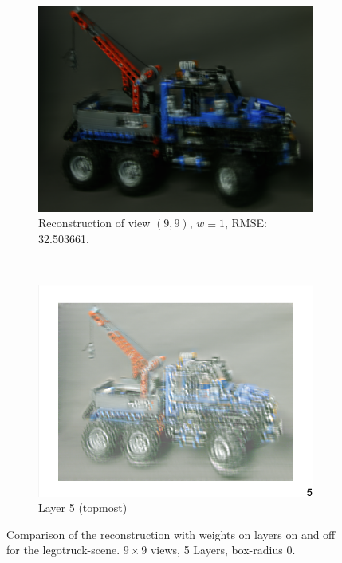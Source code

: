 \documentclass[11pt,a4paper,titlepage]{article}
\begin{document}
\begin{figure}
	\\
	\begin{subfigure}[t]{0.45\textwidth}
		\includegraphics[width=\textwidth]{results/aliasing_fixes/interpolation_on_sensor/legotruck_w=1/Reconstruction of view (9, 9).png} 
		\caption{Reconstruction of view $\left(9, 9\right)$, $w \equiv 1$, RMSE: 32.503661.}
	\end{subfigure}%
	~
	\begin{subfigure}[t]{0.45\textwidth}
		\includegraphics[width=\textwidth]{results/aliasing_fixes/interpolation_on_sensor/legotruck_w=1/5.png} 
		\caption{Layer 5 (topmost)}
	\end{subfigure}%
	\caption{Comparison of the reconstruction with weights on layers on and off for the legotruck-scene. $9 \times 9$ views, 5 Layers, box-radius 0.}
	\label{fig:comparison_sensor_interpolation_w=1_vs_w=gauss}
\end{figure}
\end{document}
